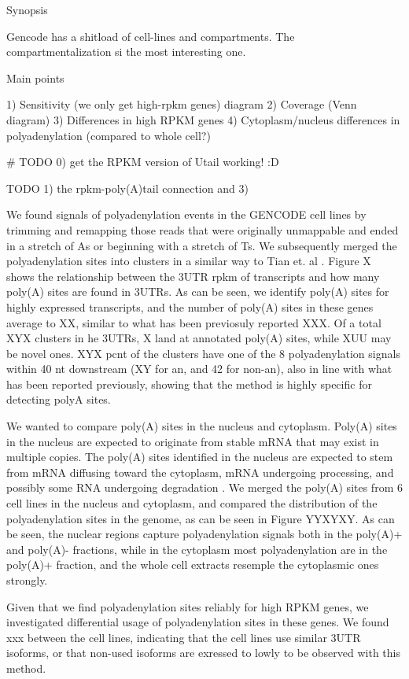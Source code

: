 \documentclass[a4paper]{article}
\begin{document}
 
Synopsis

Gencode has a shitload of cell-lines and compartments. The compartmentalization
si the most interesting one.

Main points

1) Sensitivity (we only get high-rpkm genes) diagram
2) Coverage (Venn diagram)
3) Differences in high RPKM genes
4) Cytoplasm/nucleus differences in polyadenylation (compared to whole cell?)

# TODO 0) get the RPKM version of Utail working! :D

TODO 1) the rpkm-poly(A)tail connection
and 3) %

We found signals of polyadenylation events in the GENCODE cell lines by
trimming and remapping those reads that were originally unmappable and ended in
a stretch of As or beginning with a stretch of Ts. We subsequently merged the
polyadenylation sites into clusters in a similar way to Tian et. al
\cite{tian_large-scale_2005}. Figure X shows the relationship between the 3UTR
rpkm of transcripts and how many poly(A) sites are found in 3UTRs. As can be
seen, we identify poly(A) sites for highly expressed transcripts, and the
number of poly(A) sites in these genes average to XX, similar to what has been
previosuly reported XXX. Of a total XYX clusters in he 3UTRs, X land at annotated
poly(A) sites, while XUU may be novel ones. XYX pcnt of the clusters have one of the
8 polyadenylation signals within 40 nt downstream (XY for an, and 42 for
non-an), also in line with what has been reported previously, showing that the method is highly specific for detecting polyA sites.

We wanted to compare poly(A) sites in the nucleus and cytoplasm. Poly(A) sites
in the nucleus are expected to originate from stable mRNA that may exist in
multiple copies. The poly(A) sites identified in the nucleus are expected to
stem from mRNA diffusing toward the cytoplasm, mRNA undergoing
processing, and possibly some RNA undergoing degradation
\cite{shcherbik_polyadenylation_2010,slomovic_addition_2010}. We merged the
poly(A) sites from 6 cell lines in the nucleus and cytoplasm, and compared the
distribution of the polyadenylation sites in the genome, as can be seen in
Figure YYXYXY. As can be seen, the nuclear regions capture polyadenylation
signals both in the poly(A)+ and poly(A)- fractions, while in the cytoplasm
most polyadenylation are in the poly(A)+ fraction, and the whole cell extracts
resemple the cytoplasmic ones strongly.

Given that we find polyadenylation sites reliably for high RPKM genes, we
investigated differential usage of polyadenylation sites in these genes. We
found xxx between the cell lines, indicating that the cell lines use similar
3UTR isoforms, or that non-used isoforms are exressed to lowly to be observed
with this method.



\end{document}
